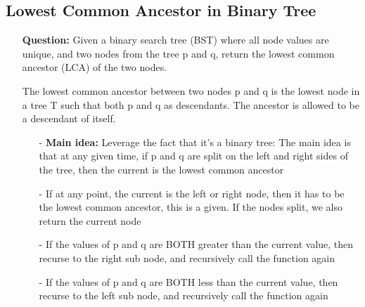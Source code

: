 \documentclass[12pt]{article}
\begin{document}
\subsection{Lowest Common Ancestor in Binary Tree}
\begin{enumerate}
  \item[] \textbf{Question:} Given a binary search tree (BST) where all node values are unique, and two nodes from the tree p and q, return the lowest common ancestor (LCA) of the two nodes.

The lowest common ancestor between two nodes p and q is the lowest node in a tree T such that both p and q as descendants. The ancestor is allowed to be a descendant of itself. 


    \begin{enumerate}
      \item[-] \textbf{Main idea:} Leverage the fact that it's a binary tree: The main idea is that at any given time, if p and q are split on the left and right sides of the tree, then the current is the lowest common ancestor
      \item[-] If at any point, the current is the left or right node, then it has to be the lowest common ancestor, this is a given. If the nodes split, we also return the current node
      \item[-] If the values of p and q are BOTH greater than the current value, then recurse to the right sub node, and recursively call the function again
      \item[-] If the values of p and q are BOTH less than the current value, then recurse to the left sub node, and recursively call the function again

    \end{enumerate}
\end{enumerate}
\end{document}
